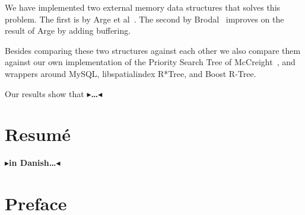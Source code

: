 \documentclass[twoside,11pt,openright]{report}
\newcommand{\todo}[1]{{\color[rgb]{.5,0,0}\textbf{$\blacktriangleright$#1$\blacktriangleleft$}}}
\begin{document}
We have implemented two external memory data structures that solves this problem. The first is by Arge et al~\cite{arge_samoladas_vitter_1999}. The second by Brodal~\cite{DBLP:journals/corr/Brodal15} improves on the result of Arge by adding buffering.

Besides comparing these two structures against each other we also compare them against our own implementation of the Priority Search Tree of McCreight~\cite{DBLP:journals/siamcomp/McCreight85}, and wrappers around MySQL, libspatialindex R*Tree, and Boost R-Tree.

Our results show that \todo{\dots}

\chapter*{Resum\'e}

\todo{in Danish\dots}

\tableofcontents

\chapter*{Preface}
\label{chp:preface}
\end{document}
